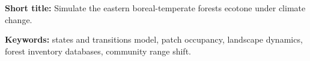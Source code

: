 \date{}
\author[1,*]{Steve Vissault (s.vissault@yahoo.fr)}
\author[1,2]{Matthew V. Talluto (mtalluto@gmail.com)}
\author[1]{Isabelle Boulangeat (isabelle.boulangeat@gmail.com)}
\author[1]{Dominique Gravel (dominique\_gravel@uqar.ca)}



\begin{titlingpage}
		\maketitle

		\begin{flushleft}

			\textbf{Short title:} Simulate the eastern boreal-temperate forests ecotone under climate change.

			\textbf{Keywords:} states and transitions model, patch occupancy, landscape dynamics, forest inventory databases, community range shift.
		\end{flushleft}
	\end{titlingpage}
